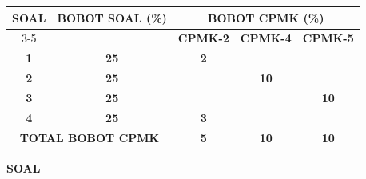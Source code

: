 \documentclass[11pt,letterpaper]{article}
\begin{document}
\begin{center}
  \begin{tabular}{|c|c|c|c|c|}
    \hline
    \multirow{2}{*}{\textbf{SOAL}}                  & \multirow{2}{*}{\textbf{BOBOT SOAL (\%)}} & \multicolumn{3}{c|}{\textbf{BOBOT CPMK (\%)}}                                     \\ \cline{3-5}
                                                    &                                           & \textbf{CPMK-2}                               & \textbf{CPMK-4} & \textbf{CPMK-5} \\ \hline
    \textbf{1}                                      & \textbf{25}                               & \textbf{2}                                    &                 &                 \\ \hline
    \textbf{2}                                      & \textbf{25}                               &                                               & \textbf{10}     &                 \\ \hline
    \textbf{3}                                      & \textbf{25}                               &                                               &                 & \textbf{10}     \\ \hline
    \textbf{4}                                      & \textbf{25}                               & \textbf{3}                                    &                 &                 \\ \hline
    \multicolumn{2}{|c|}{\textbf{TOTAL BOBOT CPMK}} & \textbf{5}                                & \textbf{10}                                   & \textbf{10}                       \\ \hline
  \end{tabular}
\end{center}

\begin{center}
  \textbf{SOAL}
\end{center}
\end{document}
